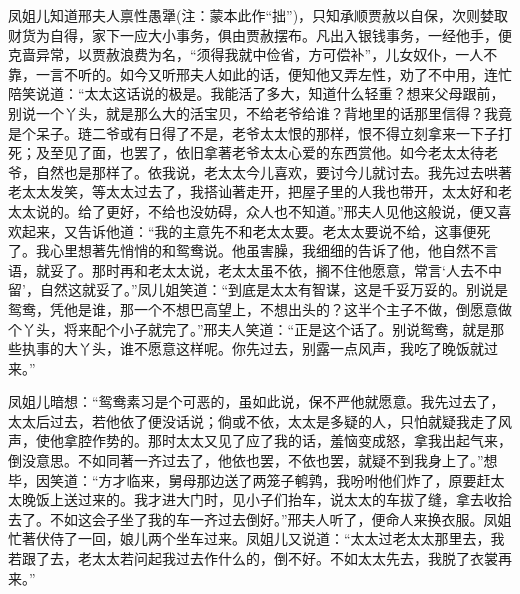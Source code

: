 \begin{parag}
    凤姐儿知道邢夫人禀性愚犟(注：蒙本此作“拙”)，只知承顺贾赦以自保，次则婪取财货为自得，家下一应大小事务，俱由贾赦摆布。凡出入银钱事务，一经他手，便克啬异常，以贾赦浪费为名，“须得我就中俭省，方可偿补”，儿女奴仆，一人不靠，一言不听的。如今又听邢夫人如此的话，便知他又弄左性，劝了不中用，连忙陪笑说道：“太太这话说的极是。我能活了多大，知道什么轻重？想来父母跟前，别说一个丫头，就是那么大的活宝贝，不给老爷给谁？背地里的话那里信得？我竟是个呆子。琏二爷或有日得了不是，老爷太太恨的那样，恨不得立刻拿来一下子打死；及至见了面，也罢了，依旧拿著老爷太太心爱的东西赏他。如今老太太待老爷，自然也是那样了。依我说，老太太今儿喜欢，要讨今儿就讨去。我先过去哄著老太太发笑，等太太过去了，我搭讪著走开，把屋子里的人我也带开，太太好和老太太说的。给了更好，不给也没妨碍，众人也不知道。”邢夫人见他这般说，便又喜欢起来，又告诉他道：“我的主意先不和老太太要。老太太要说不给，这事便死了。我心里想著先悄悄的和鸳鸯说。他虽害臊，我细细的告诉了他，他自然不言语，就妥了。那时再和老太太说，老太太虽不依，搁不住他愿意，常言‘人去不中留’，自然这就妥了。”凤儿姐笑道：“到底是太太有智谋，这是千妥万妥的。别说是鸳鸯，凭他是谁，那一个不想巴高望上，不想出头的？这半个主子不做，倒愿意做个丫头，将来配个小子就完了。”邢夫人笑道：“正是这个话了。别说鸳鸯，就是那些执事的大丫头，谁不愿意这样呢。你先过去，别露一点风声，我吃了晚饭就过来。”
\end{parag}


\begin{parag}
    凤姐儿暗想：“鸳鸯素习是个可恶的，虽如此说，保不严他就愿意。我先过去了，太太后过去，若他依了便没话说；倘或不依，太太是多疑的人，只怕就疑我走了风声，使他拿腔作势的。那时太太又见了应了我的话，羞恼变成怒，拿我出起气来，倒没意思。不如同著一齐过去了，他依也罢，不依也罢，就疑不到我身上了。”想毕，因笑道：“方才临来，舅母那边送了两笼子鹌鹑，我吩咐他们炸了，原要赶太太晚饭上送过来的。我才进大门时，见小子们抬车，说太太的车拔了缝，拿去收拾去了。不如这会子坐了我的车一齐过去倒好。”邢夫人听了，便命人来换衣服。凤姐忙著伏侍了一回，娘儿两个坐车过来。凤姐儿又说道：“太太过老太太那里去，我若跟了去，老太太若问起我过去作什么的，倒不好。不如太太先去，我脱了衣裳再来。”
\end{parag}


